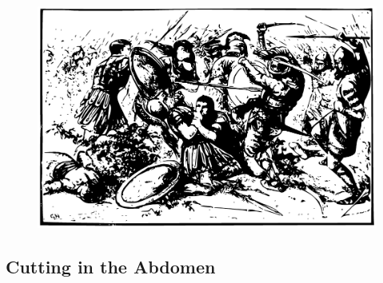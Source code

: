\documentclass[12pt]{book}
\begin{document}
\begin{figure}[h]
    \centering
    \includegraphics[width=\textwidth]{./images/combat04.pdf}
\end{figure}

\subsection{Cutting in the Abdomen}
\end{document}
